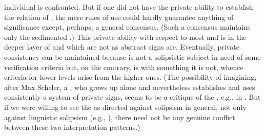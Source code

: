 {  individual is confronted. But if one did not have the private ability to
  establish the relation of , the mere rules of use could hardly
  guarantee anything of significance except, perhaps, a general consensus. (Such
  a consensus maintains only the sedimented .)  This private
  ability with respect to most   and  is
   in the deeper layer of  and  which are
  not  as abstract signs are.  Eventually, private consistency
  can be maintained because  is not a solipsistic subject in need
  of some  verification criteria but, on the contrary, is
   with something it is not, whence criteria for lower levels
  arise from the higher ones. (The possibility of imagining, after Max Scheler,
  a , who grows up alone and nevertheless establishes and
  uses consistently a system of private signs, seems to be a critique of the
  , e.g., in \citeauthor*{LanguageRules}. But if we were willing
  to see the  as directed against solipsism in general, not only
  against linguistic solipsism (e.g., \citeauthor*{LanguageRulesMalcolm}), there
  need not be any genuine conflict between these two interpretation patterns.)}



